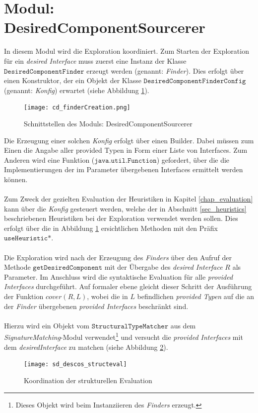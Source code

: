 \section{Modul: DesiredComponentSourcerer}
In diesem Modul wird die Exploration koordiniert. Zum Starten der Exploration für ein \emph{desired Interface} muss zuerst eine Instanz der Klasse $\texttt{DesiredComponentFinder}$ erzeugt werden (genannt: \emph{Finder}). Dies erfolgt über einen Konstruktor, der ein Objekt der Klasse $\texttt{DesiredComponentFinderConfig}$ (genannt: \emph{Konfig}) erwartet (siehe Abbildung \ref{cd_finderCreation}). 
\begin{figure}[h!]
\centering
\texttt{[image: cd\_finderCreation.png]}
\caption{Schnittstellen des Moduls: DesiredComponentSourcerer}
\label{cd_finderCreation}
\end{figure}
\noindent
Die Erzeugung einer solchen \emph{Konfig} erfolgt über einen Builder. Dabei müssen zum Einen die Angabe aller provided Typen in Form einer Liste von Interfaces. Zum Anderen wird eine Funktion ($\texttt{java.util.Function}$) gefordert, über die die Implementierungen der im Parameter übergebenen Interfaces ermittelt werden können.
\\\\
Zum Zweck der gezielten Evaluation der Heuristiken in Kapitel \ref{chap_evaluation} kann über die \emph{Konfig} gesteuert werden, welche der in Abschnitt \ref{sec_heuristics} beschriebenen Heuristiken bei der Exploration verwendet werden sollen. Dies erfolgt über die in Abbildung \ref{cd_finderCreation} ersichtlichen Methoden mit den Präfix $\texttt{useHeuristic*}$.
\\\\
Die Exploration wird nach der Erzeugung des \emph{Finders} über den Aufruf der Methode $\texttt{getDesiredComponent}$ mit der Übergabe des \emph{desired Interface} $R$ als Parameter. Im Anschluss wird die syntaktische Evaluation für alle \emph{provided Interfaces} durchgeführt. Auf formaler ebene gleicht dieser Schritt der Ausführung der Funktion $\mathit{cover(R,L)}$, wobei die in $L$ befindlichen \emph{provided Typen} auf die an der \emph{Finder} übergebenen \emph{provided Interfaces} beschränkt sind.
\\\\
Hierzu wird ein Objekt vom $\texttt{StructuralTypeMatcher}$ aus dem \emph{SignatureMatching}-Modul verwendet\footnote{Dieses Objekt wird beim Instanziieren des \emph{Finders} erzeugt.} und versucht die \emph{provided Interfaces} mit dem \emph{desiredInterface} zu matchen (siehe Abbildung \ref{sd_descos_structeval}).
\begin{figure}
\texttt{[image: sd\_descos\_structeval]}
\caption{Koordination der strukturellen Evaluation}
\label{sd_descos_structeval}
\end{figure}

